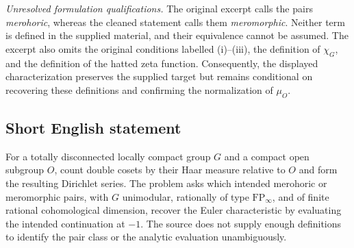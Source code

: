\documentclass[11pt]{article}
\begin{document}
\emph{Unresolved formulation qualifications.} The original excerpt calls the pairs \emph{merohoric}, whereas the cleaned statement calls them \emph{meromorphic}. Neither term is defined in the supplied material, and their equivalence cannot be assumed. The excerpt also omits the original conditions labelled (i)--(iii), the definition of \(\chi_G\), and the definition of the hatted zeta function. Consequently, the displayed characterization preserves the supplied target but remains conditional on recovering these definitions and confirming the normalization of \(\mu_O\).
\subsection{Short English statement}
For a totally disconnected locally compact group \(G\) and a compact open subgroup \(O\), count double cosets by their Haar measure relative to \(O\) and form the resulting Dirichlet series. The problem asks which intended merohoric or meromorphic pairs, with \(G\) unimodular, rationally of type \(\mathrm{FP}_{\infty}\), and of finite rational cohomological dimension, recover the Euler characteristic by evaluating the intended continuation at \(-1\). The source does not supply enough definitions to identify the pair class or the analytic evaluation unambiguously.
\end{document}
